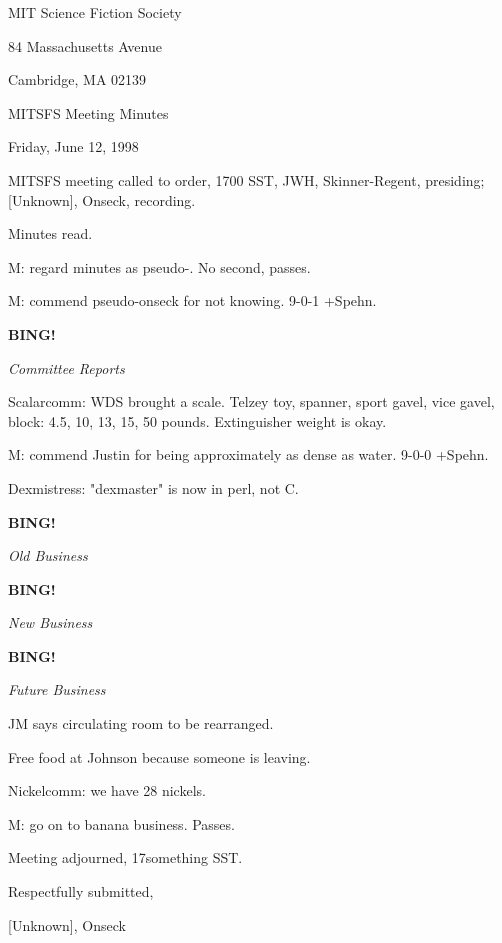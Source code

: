 \documentclass[12pt]{article}
\newcommand{\bing}{{\bf BING!} }
\newcommand{\goto}[1]{\bing \vskip 12pt \centerline{{\em{#1}}}}
\begin{document}
\begin{center}

MIT Science Fiction Society 

84 Massachusetts Avenue

Cambridge, MA 02139

\vspace{12pt}

MITSFS Meeting Minutes 

Friday, June 12, 1998

\end{center}
 
\vspace{18pt}

\setlength{\parskip}{6pt}

\noindent
MITSFS meeting called to order, 1700 SST,
JWH, Skinner-Regent, presiding; [Unknown], Onseck, recording.

Minutes read.

M: regard minutes as pseudo-. No second, passes.

M: commend pseudo-onseck for not knowing. 9-0-1 +Spehn.

\goto{Committee Reports}

Scalarcomm: WDS brought a scale. Telzey toy, spanner, sport gavel, vice gavel, block: 4.5, 10, 13, 15, 50 pounds. Extinguisher weight is okay.

M: commend Justin for being approximately as dense as water. 9-0-0 +Spehn.

Dexmistress: "dexmaster" is now in perl, not C.

\goto{Old Business}

\goto{New Business}

\goto{Future Business}

JM says circulating room to be rearranged.

Free food at Johnson because someone is leaving.

Nickelcomm: we have 28 nickels.

M: go on to banana business. Passes.

\vspace{12pt}

\noindent
Meeting adjourned, 17something SST.

\vspace{18pt}

\centerline{Respectfully submitted,}
\centerline{[Unknown], Onseck}
\end{document}
